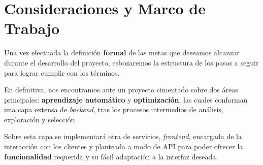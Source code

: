 \section{Consideraciones y Marco de Trabajo}

Una vez efectuada la definición \textbf{formal} de las metas que deseamos alcanzar durante el desarrollo del proyecto, esbozaremos la estructura de los pasos a seguir para lograr cumplir con los términos.

En definitiva, nos encontramos ante un proyecto cimentado sobre dos áreas principales: \textbf{aprendizaje automático} y \textbf{optimización}, las cuales conforman una capa extensa de \textit{backend}, tras los procesos intermedios de análisis, exploración y selección.

Sobre esta capa se implementará otra de servicios, \textit{frontend}, encargada de la interacción con los clientes y planteada a modo de API para poder ofrecer la \textbf{funcionalidad} requerida y su fácil adaptación a la interfaz deseada.


